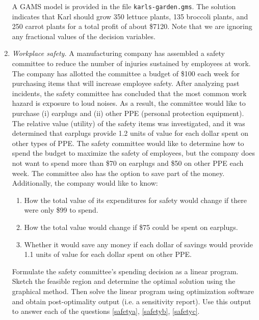 \begin{enumerate}
\begin{solution}
  \bs A GAMS model is provided in the file
  \texttt{karls-garden.gms}. The solution indicates that Karl should
  grow 350 lettuce plants, 135 broccoli plants, and 250 carrot plants
  for a total profit of about \$\num{7120}. Note that we are ignoring
  any fractional values of the decision variables.
\end{solution}


\item \emph{Workplace safety.}  A manufacturing
  company has assembled a safety committee to reduce the number of
  injuries sustained by employees at work. The company has allotted
  the committee a budget of \$100 each week for purchasing items that
  will increase employee safety. After analyzing past incidents, the
  safety committee has concluded that the most common work hazard is
  exposure to loud noises. As a result, the committee would like to
  purchase (i) earplugs and (ii) other PPE (personal protection
  equipment). The relative value (utility) of the safety items was
  investigated, and it was determined that earplugs provide 1.2 units
  of value for each dollar spent on other types of PPE. The safety
  committee would like to determine how to spend the budget to
  maximize the safety of employees, but the company does not want to
  spend more than \$70 on earplugs and \$50 on other PPE each
  week. The committee also has the option to save part of the money.
  Additionally, the company would like to know:
\begin{enumerate}
\item How the total value of its expenditures for safety would change
  if there were only \$99 to spend. \label{safetya}
\item How the total value would change if \$75 could be spent on
  earplugs.\label{safetyb}
\item Whether it would save any money if each dollar of savings would
  provide 1.1 units of value for each dollar spent on other
  PPE.\label{safetyc}
\end{enumerate}
Formulate the safety committee's spending decision as a linear program. Sketch
the feasible region and determine the optimal solution using the
graphical method.  Then solve the linear program using optimization
software and obtain post-optimality output (i.e. a sensitivity
report).  Use this output to answer each of the questions \ref{safetya},
\ref{safetyb}, \ref{safetyc}.


\end{enumerate}
